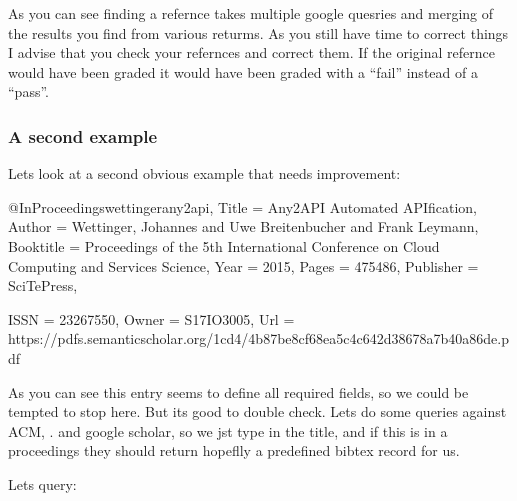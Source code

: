 As you can see finding a refernce takes multiple google quesries and
merging of the results you find from various returms. As you still
have time to correct things I advise that you check your refernces and
correct them. If the original refernce would have been graded it would
have been graded with a ``fail'' instead of a ``pass''.


\subsubsection{A second example}
\label{\detokenize{faq:a-second-example}}
Lets look at a second obvious example that needs improvement:

\begin{sphinxVerbatim}[commandchars=\\\{\}]
@InProceedings\PYGZob{}wettinger\PYGZhy{}any2api,
  Title                    = \PYGZob{}Any2API \PYGZhy{} Automated APIfication\PYGZcb{},
  Author                   = \PYGZob{}Wettinger, Johannes and
                              Uwe Breitenb\PYGZob{}\PYGZbs{}\PYGZdq{}u\PYGZcb{}cher
                              and Frank Leymann\PYGZcb{},
  Booktitle                = \PYGZob{}Proceedings of the 5th International
                              Conference on Cloud Computing and
                              Services Science\PYGZcb{},
  Year                     = \PYGZob{}2015\PYGZcb{},
  Pages                    = \PYGZob{}475­486\PYGZcb{},
  Publisher                = \PYGZob{}SciTePress\PYGZcb{},

  ISSN                     = \PYGZob{}2326\PYGZhy{}7550\PYGZcb{},
  Owner                    = \PYGZob{}S17\PYGZhy{}IO\PYGZhy{}3005\PYGZcb{},
  Url                      = \PYGZob{}https://pdfs.semanticscholar.org/1cd4/4b87be8cf68ea5c4c642d38678a7b40a86de.pdf\PYGZcb{}
\PYGZcb{}
\end{sphinxVerbatim}

As you can see this entry seems to define all required fields, so we
could be tempted to stop here. But its good to double check. Lets do
some queries against ACM, . and google scholar, so we jst type in
the title, and if this is in a proceedings they should return hopeflly
a predefined bibtex record for us.

Lets query:

\begin{sphinxVerbatim}[commandchars=\\\{\}]
    
\end{sphinxVerbatim}

